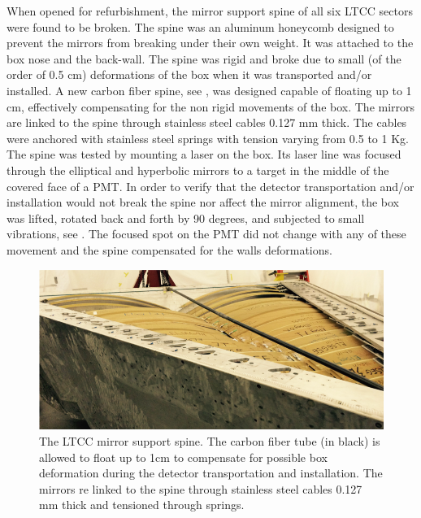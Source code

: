 When opened for refurbishment, the mirror support spine of all six LTCC sectors were found to be broken. The spine was an aluminum honeycomb designed to prevent
the mirrors from breaking under their own weight. It was attached to the box nose and the back-wall. The spine was rigid and broke due to small
(of the order of 0.5 cm) deformations of the box when it was transported and/or installed.
A new carbon fiber spine, see , was designed capable of floating up to 1 cm, effectively compensating for the non rigid movements of the box.
The mirrors are linked to the spine through stainless steel cables 0.127 mm thick. The cables were anchored with stainless steel springs with tension varying from 0.5 to 1 Kg.
The spine was tested by mounting a laser on the box. Its laser line was focused through the elliptical and hyperbolic mirrors to a target in the middle of the covered face of a PMT.
In order to verify that the detector transportation and/or installation would not break the spine nor affect the mirror alignment, the box was lifted,
rotated back and forth by 90 degrees, and subjected to small vibrations, see . The focused spot on the PMT did not change with any of these movement and the spine
compensated for the walls deformations.

\begin{figure}
	\centering
	\includegraphics[width=1.0\columnwidth,keepaspectratio]{img/spine.png}
	\caption{The LTCC mirror support spine. The carbon fiber tube (in black) is allowed to float up to 1cm to compensate for possible box deformation during the detector
            transportation and installation. The mirrors re linked to the spine through stainless steel cables 0.127 mm thick and tensioned through springs.}
	\label{fig:spine}
\end{figure}


